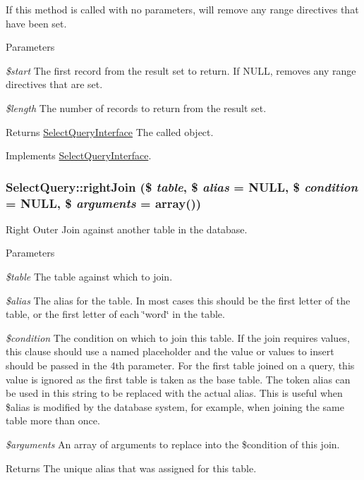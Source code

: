 If this method is called with no parameters, will remove any range directives that have been set.


\begin{DoxyParams}{Parameters}
\item[{\em \$start}]The first record from the result set to return. If NULL, removes any range directives that are set. \item[{\em \$length}]The number of records to return from the result set. \end{DoxyParams}
\begin{DoxyReturn}{Returns}
\hyperlink{interfaceSelectQueryInterface}{SelectQueryInterface} The called object. 
\end{DoxyReturn}


Implements \hyperlink{interfaceSelectQueryInterface_a028f87f97fb72e0e43050740fd323181}{SelectQueryInterface}.\hypertarget{classSelectQuery_a0b3a40164be944401296be9e9ab1c23c}{
\subsubsection[{rightJoin}]{\setlength{\rightskip}{0pt plus 5cm}SelectQuery::rightJoin (\$ {\em table}, \/  \$ {\em alias} = {\ttfamily NULL}, \/  \$ {\em condition} = {\ttfamily NULL}, \/  \$ {\em arguments} = {\ttfamily array()})}}
\label{classSelectQuery_a0b3a40164be944401296be9e9ab1c23c}
Right Outer Join against another table in the database.


\begin{DoxyParams}{Parameters}
\item[{\em \$table}]The table against which to join. \item[{\em \$alias}]The alias for the table. In most cases this should be the first letter of the table, or the first letter of each \char`\"{}word\char`\"{} in the table. \item[{\em \$condition}]The condition on which to join this table. If the join requires values, this clause should use a named placeholder and the value or values to insert should be passed in the 4th parameter. For the first table joined on a query, this value is ignored as the first table is taken as the base table. The token alias can be used in this string to be replaced with the actual alias. This is useful when \$alias is modified by the database system, for example, when joining the same table more than once. \item[{\em \$arguments}]An array of arguments to replace into the \$condition of this join. \end{DoxyParams}
\begin{DoxyReturn}{Returns}
The unique alias that was assigned for this table. 
\end{DoxyReturn}


